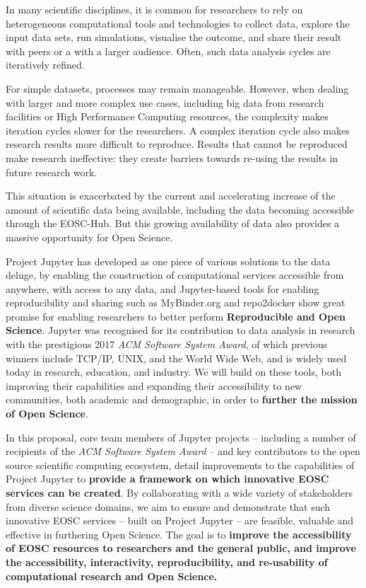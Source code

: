 
In many scientific disciplines, it is common for researchers to rely on
heterogeneous computational tools and technologies to collect data,
explore the input data sets, run simulations, visualise the outcome,
and share their result with peers or a with a larger audience. Often,
such data analysis cycles are iteratively refined.

For simple datasets, processes may remain manageable. However, when
dealing with larger and more complex use cases, including big data
from research facilities or High Performance Computing resources, the
complexity makes iteration cycles slower for the researchers. A
complex iteration cycle also makes research results more difficult to
reproduce.
Results that cannot be reproduced make research ineffective: they
create barriers towards re-using the results in future research work.

This situation is exacerbated by the current and accelerating increase of the amount
of scientific data being available, including the data becoming
accessible through the EOSC-Hub. But this growing availability of data also provides a massive opportunity
for Open Science.

Project Jupyter has developed as one piece of various solutions to the data deluge,
by enabling the construction of computational services accessible from anywhere,
with access to any data,
and Jupyter-based tools for enabling reproducibility and sharing such as MyBinder.org and repo2docker
show great promise for enabling researchers to better perform \textbf{Reproducible and Open Science}.
Jupyter was recognised for its contribution to data analysis in research with the prestigious 2017 \emph{ACM Software System Award}, of which previous winners include TCP/IP, UNIX, and the World Wide Web,
and is widely used today in research,
education, and industry.
We will build on these tools,
both improving their capabilities
and expanding their accessibility to new communities,
both academic and demographic,
in order to \textbf{further the mission of Open Science}.

In this proposal, core team members of Jupyter projects -- including a
number of recipients of the \emph{ACM Software System Award} -- and key contributors to the
open source scientific computing ecosystem,
detail improvements to the
capabilities of Project Jupyter
to \textbf{provide a framework on which innovative EOSC services can be created}.
By collaborating with a wide variety of stakeholders from diverse
science domains,
we aim to ensure and demonstrate that such
innovative EOSC services -- built on Project Jupyter -- are feasible, valuable and effective in furthering Open Science.
The goal is to \textbf{improve the
accessibility of EOSC resources to researchers and the general public,
and improve the accessibility, interactivity, reproducibility, and
re-usability of computational research
and Open Science.}


